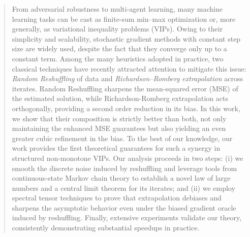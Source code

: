 \documentclass{article} %
\author{Konstantinos Emmanouilidis$^*$,  Emmanouil-Vasileios Vlatakis-Gkaragkounis$^\#$, Ren\'{e} Vidal$^*$ 
\\
Department of Computer Science\\
$^*$University of Pennsylvania, $^\#$University of Wisconsin-Madison\\
}
\theoremstyle{informal}
\theoremstyle{remark}
\newcommand{\kostas}[1]{#1}%
\newcommand{\manolis}[1]{\textcolor{orange}{[#1]}}
\newcommand{\onlyappendixintoc}{%
  \let\oldaddcontentsline\addcontentsline
  \renewcommand{\addcontentsline}[3]{}%
}
\newcommand{\restoreaddcontentsline}{%
  \let\addcontentsline\oldaddcontentsline
}
\begin{document}
\onlyappendixintoc        %


\maketitle

\begin{abstract}
From adversarial robustness to multi-agent learning, many machine learning tasks can be cast as finite-sum min–max optimization  or, more generally, as variational inequality problems (VIPs). Owing to their simplicity and scalability, stochastic gradient methods with constant step size are widely used, despite the fact that they converge only up to a \kostas{constant} term. Among the many heuristics adopted in practice, two classical techniques have recently attracted attention to mitigate this issue: \emph{Random Reshuffling} of data and \emph{Richardson–Romberg extrapolation} across iterates. \kostas{Random Reshuffling sharpens the mean-squared error (MSE) of the estimated solution, while Richardson-Romberg extrapolation acts orthogonally, providing a second order reduction in its bias. In this work, we show that their composition is strictly better than both, not only maintaining the enhanced MSE guarantees but also yielding an even greater cubic refinement in the bias.}
To the best of our knowledge, our work provides the first theoretical guarantees for such a synergy in structured non-monotone VIPs. Our analysis proceeds in two steps: (i)
we smooth the discrete noise induced by reshuffling
and leverage tools from continuous-state Markov chain theory to establish a novel law of large numbers and a central limit theorem for its iterates; and (ii) we employ spectral tensor techniques to prove that extrapolation 
debiases and sharpens the asymptotic behavior %
even under the biased gradient oracle induced by reshuffling. Finally, extensive experiments validate our theory, consistently demonstrating substantial speedups in practice.
\end{abstract}
\vspace{-1em}










\appendix
\restoreaddcontentsline   %

\newpage

\end{document}
